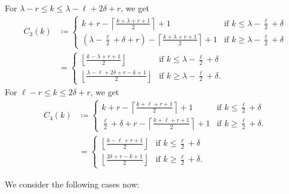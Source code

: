 \begin{itemize}
  \ii For $\lambda - r \le k \le \lambda - \ell + 2 \delta + r$, we get
  \begin{align*}
    C_3(k)
    &\coloneqq \begin{cases}
      k + r - \left\lceil \frac{k+\lambda+r+1}{2} \right\rceil + 1 &\text{if } k \le \lambda - \frac{\ell}{2} + \delta \\
      \left( \lambda - \frac{\ell}{2} + \delta + r \right) - \left\lceil \frac{k+\lambda+r+1}{2} \right\rceil + 1 &\text{if } k \ge \lambda - \frac{\ell}{2} + \delta
    \end{cases} \\
    &= \begin{cases}
      \left\lfloor \frac{k-\lambda+r+1}{2} \right\rfloor &\text{if } k \le \lambda - \frac{\ell}{2} + \delta \\
      \left\lfloor \frac{\lambda - \ell + 2\delta + r - k + 1}{2} \right\rfloor &\text{if } k \ge \lambda - \frac{\ell}{2} + \delta.
    \end{cases}
  \end{align*}
  \ii For $\ell - r \le k \le 2 \delta + r$, we get
  \begin{align*}
    C_4(k)
    &\coloneqq \begin{cases}
      k + r - \left\lceil \frac{k+\ell+r+1}{2} \right\rceil + 1 &\text{if } k \le \frac{\ell}{2}+\delta \\
      \frac{\ell}{2} + \delta + r - \left\lceil \frac{k+\ell+r+1}{2} \right\rceil + 1 &\text{if } k \ge \frac{\ell}{2}+\delta.
    \end{cases} \\
    &= \begin{cases}
      \left\lfloor \frac{k-\ell+r+1}{2} \right\rfloor &\text{if } k \le \frac{\ell}{2}+\delta \\
      \left\lfloor \frac{2\delta+r-k+1}{2} \right\rfloor &\text{if } k \ge \frac{\ell}{2}+\delta.
    \end{cases}
  \end{align*}
\end{itemize}
We consider the following cases now:
